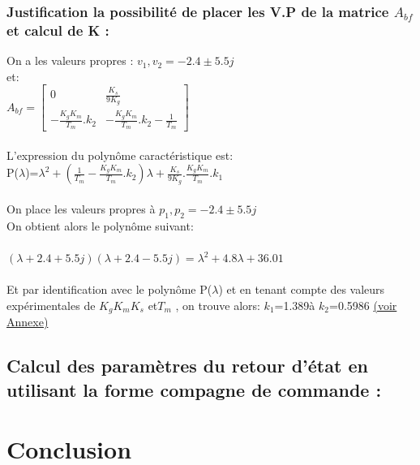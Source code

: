 \documentclass[12pt, a4paper, openany]{report}
\begin{document}
\subsection{Justification la possibilité de placer les V.P de la matrice $A_{bf}$ et calcul de K :}

On a les valeurs propres : $v_{1},v_{2}=-2.4\pm5.5j$ \\
et:\\
$A_{bf}=
\begin{bmatrix} 
0 & \frac{K_{s}}{9K_{g}} \\
-\frac{K_{g}K_{m}}{T_{m}}.k_{2} & -\frac{K_{g}K_{m}}{T_{m}}.k_{2}-\frac{1}{T_{m}}
\end{bmatrix}$ \\\\

L'expression du polynôme caractéristique est:\\
P($\lambda$)=$\lambda^2+(\frac{1}{T_{m}}-\frac{K_{g}K_{m}}{T_{m}}.k_{2})\lambda+\frac{K_{s}}{9K_{g}}.\frac{K_{g}K_{m}}{T_{m}}.k_{1}$\\\\

On place les valeurs propres à $p_{1},p_{2}=-2.4\pm5.5j$\\

On obtient alors le polynôme suivant: \\\\
$(\lambda+2.4+5.5j)(\lambda+2.4-5.5j)={\lambda}^2+4.8\lambda+36.01$\\\\

Et par identification avec le polynôme P($\lambda$) et en tenant compte des valeurs expérimentales de $K_{g} K_{m} K_{s}$ et$T_{m}$ , on trouve alors:  $k_1$=1.389à \quad $k_2$=0.5986 \hyperref[section1.1]{(voir Annexe)}\label{annexe1}\\



\section{Calcul des paramètres du retour d'état en utilisant la forme compagne de commande :}





\chapter*{Conclusion}
\end{document}
